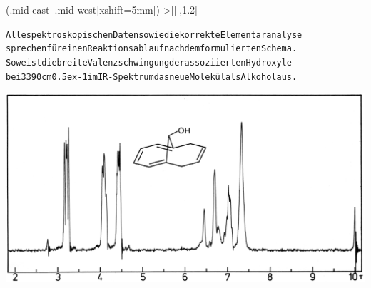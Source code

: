 \documentclass[a4paper,11pt]{article}
\begin{document}
\arrow(.mid east--.mid west[xshift=5mm]){->[]}[,1.2]
\schemestop
\chemnameinit{}
\begin{alltt}

\newpage
{}

Alle spektroskopischen Daten sowie die korrekte Elementaranalyse
sprechen für einen Reaktionsablauf nach dem formulierten Schema.
So weist die breite Valenzschwingung der assoziierten Hydroxyle
bei 3390 cm\raise0.5ex\hbox{-1} im IR-Spektrum das neue Molekül als Alkohol aus.

             

\end{alltt}
\hspace*{-0.5cm}\includegraphics[width=14.31cm]{NMR_018}
\end{document}
